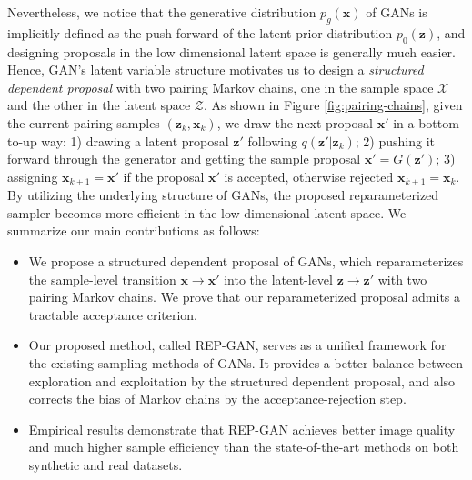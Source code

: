 \documentclass{article} %
\newcommand{\bx}{\mathbf{x}}
\newcommand{\bz}{\mathbf{z}}
\newcommand{\cX}{\mathcal{X}}
\newcommand{\cZ}{\mathcal{Z}}
\newcommand{\<}{\left\langle}
\renewcommand{\>}{\right\rangle}
\begin{document}
Nevertheless, we notice that the generative distribution $p_g(\bx)$ of GANs is implicitly defined as the push-forward of the latent prior distribution $p_0(\bz)$, and designing proposals in the low dimensional latent space is generally much easier. Hence, GAN's latent variable structure motivates us to design a \emph{structured dependent proposal} with two pairing Markov chains, one in the sample space $\cX$ and the other in the latent space $\cZ$. As shown in Figure \ref{fig:pairing-chains}, given the current pairing samples $(\bz_k,\bx_k)$, we draw the next proposal $\bx'$ in a bottom-to-up way: 1) drawing a latent proposal $\bz'$ following $q(\bz'|\bz_k)$; 2) pushing it forward through the generator and getting the sample proposal $\bx'=G(\bz')$; 3) assigning $\bx_{k+1}=\bx'$ if the proposal $\bx'$ is accepted, otherwise rejected $\bx_{k+1}=\bx_k$. By utilizing the underlying structure of GANs, the proposed reparameterized sampler becomes more efficient in the low-dimensional latent space. 
We summarize our main contributions as follows:
\begin{itemize}
    \item We propose a structured dependent proposal of GANs, which reparameterizes the sample-level transition $\bx\to\bx'$ into the latent-level  $\bz\to\bz'$ with two pairing Markov chains. We prove that our reparameterized proposal admits
    a tractable acceptance criterion.
    \item Our proposed method, called REP-GAN, serves as a unified framework for the existing sampling methods of GANs. It provides a better balance between exploration and exploitation by the structured dependent proposal, and also corrects the bias of Markov chains by the acceptance-rejection step. 
    \item Empirical results demonstrate that REP-GAN achieves better image quality and much higher sample efficiency than the state-of-the-art methods on both synthetic and real datasets. 
\end{itemize}
\end{document}
